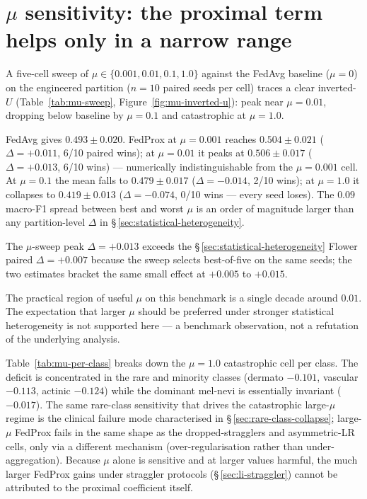 
\section{$\mu$ sensitivity: the proximal term helps only in a narrow range}
\label{sec:mu-sensitivity}

A five-cell sweep of $\mu \in \{0.001, 0.01, 0.1, 1.0\}$ against the FedAvg
baseline ($\mu = 0$) on the engineered partition ($n=10$ paired seeds per
cell) traces a clear inverted-$U$ (Table~\ref{tab:mu-sweep},
Figure~\ref{fig:mu-inverted-u}): peak near $\mu = 0.01$, dropping below
baseline by $\mu = 0.1$ and catastrophic at $\mu = 1.0$.

FedAvg gives $0.493 \pm 0.020$. FedProx at $\mu = 0.001$ reaches
$0.504 \pm 0.021$ ($\Delta = +0.011$, 6/10 paired wins); at $\mu = 0.01$ it
peaks at $0.506 \pm 0.017$ ($\Delta = +0.013$, 6/10 wins) --- numerically
indistinguishable from the $\mu = 0.001$ cell. At $\mu = 0.1$ the mean falls
to $0.479 \pm 0.017$ ($\Delta = -0.014$, 2/10 wins); at $\mu = 1.0$ it
collapses to $0.419 \pm 0.013$ ($\Delta = -0.074$, 0/10 wins --- every seed
loses). The $0.09$ macro-F1 spread between best and worst $\mu$ is an order
of magnitude larger than any partition-level $\Delta$ in
\S\,\ref{sec:statistical-heterogeneity}.

The $\mu$-sweep peak $\Delta = +0.013$ exceeds the
\S\,\ref{sec:statistical-heterogeneity} Flower paired $\Delta = +0.007$
because the sweep selects best-of-five on the same seeds; the two estimates
bracket the same small effect at $+0.005$ to $+0.015$.

The practical region of useful $\mu$ on this benchmark is a single decade
around $0.01$. The expectation that larger $\mu$ should be preferred under
stronger statistical heterogeneity is not supported here --- a benchmark
observation, not a refutation of the underlying analysis.

Table~\ref{tab:mu-per-class} breaks down the $\mu = 1.0$ catastrophic cell
per class. The deficit is concentrated in the rare and minority classes
(dermato $-0.101$, vascular $-0.113$, actinic $-0.124$) while the dominant
mel-nevi is essentially invariant ($-0.017$). The same rare-class
sensitivity that drives the catastrophic large-$\mu$ regime is the
clinical failure mode characterised in
\S\,\ref{sec:rare-class-collapse}; large-$\mu$ FedProx fails in the same
shape as the dropped-stragglers and asymmetric-LR cells, only via a
different mechanism (over-regularisation rather than under-aggregation).
Because $\mu$ alone is sensitive and at larger values harmful, the much
larger FedProx gains under straggler protocols
(\S\,\ref{sec:li-straggler}) cannot be attributed to the proximal
coefficient itself.



